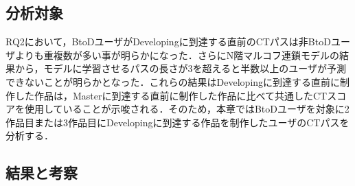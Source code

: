 \documentclass[submit]{ipsj}
\newcommand{\todo}[1]{\colorbox{yellow}{{\bf TODO}:}{\color{red} {\textbf{[#1]}}}}
\begin{document}
\subsection{分析対象}
RQ2において，BtoDユーザがDevelopingに到達する直前のCTパスは非BtoDユーザよりも重複数が多い事が明らかになった．さらにN階マルコフ連鎖モデルの結果から，モデルに学習させるパスの長さが3を超えると半数以上のユーザが予測できないことが明らかとなった．これらの結果はDevelopingに到達する直前に制作した作品は，Masterに到達する直前に制作した作品に比べて共通したCTスコアを使用していることが示唆される．そのため，本章ではBtoDユーザを対象に2作品目または3作品目にDevelopingに到達する作品を制作したユーザのCTパスを分析する．



\subsection{結果と考察}

\begin{table}[t]
  \caption{2番目または3番目にDevelopingの作品を制作したBtoDユーザ数，およびDevelopingを制作するまで（Developingに到達時の作品を含む）のCTパスの種類数}
  \label{tab:ct-users}
  \vspace{2mm}
  \centering
   \vspace{-2mm}
\end{table}
\end{document}
